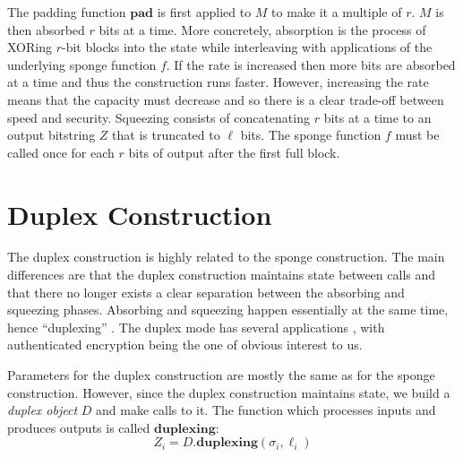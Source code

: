 The padding function $\mathbf{pad}$ is first applied to $M$ to make it a multiple of $r$.
$M$ is then absorbed $r$ bits at a time.
More concretely, absorption is the process of XORing $r$-bit blocks into the state while interleaving with applications of the underlying sponge function $f$.
If the rate is increased then more bits are absorbed at a time and thus the construction runs faster.
However, increasing the rate means that the capacity must decrease and so there is a clear trade-off between speed and security.
Squeezing consists of concatenating $r$ bits at a time to an output bitstring $Z$ that is truncated to $\ell$ bits.
The sponge function $f$ must be called once for each $r$ bits of output after the first full block.

\section{Duplex Construction}
The duplex construction is highly related to the sponge construction.
The main differences are that the duplex construction maintains state between calls and that there no longer exists a clear separation between the absorbing and squeezing phases.
Absorbing and squeezing happen essentially at the same time, hence ``duplexing'' \cite{Bertoni2012_Duplexing}.
The duplex mode has several applications \cite{Bertoni2010_DuplexingSlides}, with authenticated encryption being the one of obvious interest to us.

Parameters for the duplex construction are mostly the same as for the sponge construction.
However, since the duplex construction maintains state, we build a \emph{duplex object} $D$ and make calls to it.
The function which processes inputs and produces outputs is called $\mathbf{duplexing}$:
\begin{equation*}
Z_i = D.\mathbf{duplexing}(\sigma_i,\ell_i)
\end{equation*}

